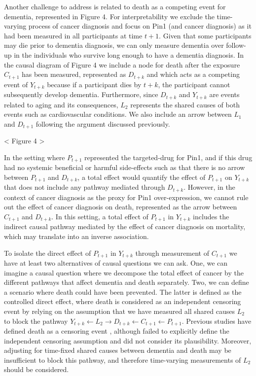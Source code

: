 \documentclass[
]{book}
\begin{document}
Another challenge to address is related to death as a competing event for dementia, represented in Figure 4. For interpretability we exclude the time-varying process of cancer diagnosis and focus on Pin1 (and cancer diagnosis) as it had been measured in all participants at time \(t+1\). Given that some participants may die prior to dementia diagnosis, we can only measure dementia over follow-up in the individuals who survive long enough to have a dementia diagnosis. In the causal diagram of Figure 4 we include a node for death after the exposure \(C_{t+1}\) has been measured, represented as \(D_{t+k}\) and which acts as a competing event of \(Y_{t+k}\) because if a participant dies by \(t + k\), the participant cannot subsequently develop dementia. Furthermore, since \(D_{t+k}\) and \(Y_{t+k}\) are events related to aging and its consequences, \(L_2\) represents the shared causes of both events such as cardiovascular conditions. We also include an arrow between \(L_1\) and \(D_{t+1}\) following the argument discussed previously.

\textless{} Figure 4 \textgreater{}

In the setting where \(P_{t+1}\) represented the targeted-drug for Pin1, and if this drug had no systemic beneficial or harmful side-effects such as that there is no arrow between \(P_{t+1}\) and \(D_{t+k}\), a total effect would quantify the effect of \(P_{t+1}\) on \(Y_{t+k}\) that does not include any pathway mediated through \(D_{t+k}\)\autocite{young2020}. However, in the context of cancer diagnosis as the proxy for Pin1 over-expression, we cannot rule out the effect of cancer diagnosis on death, represented as the arrow between \(C_{t+1}\) and \(D_{t+k}\). In this setting, a total effect of \(P_{t+1}\) in \(Y_{t+k}\) includes the indirect causal pathway mediated by the effect of cancer diagnosis on mortality, which may translate into an inverse association\autocite{young2020}.

To isolate the direct effect of \(P_{t+1}\) in \(Y_{t+k}\) through measurement of \(C_{t+1}\) we have at least two alternatives of causal questions we can ask. One, we can imagine a causal question where we decompose the total effect of cancer by the different pathways that affect dementia and death separately\autocite{stensrud2020}. Two, we can define a scenario where death could have been prevented. The latter is defined as the controlled direct effect, where death is considered as an independent censoring event by relying on the assumption that we have measured all shared causes \(L_2\) to block the pathway \(Y_{t+k} \leftarrow L_2 \rightarrow D_{t+k} \leftarrow C_{t+1} \leftarrow P_{t+1}\). Previous studies have defined death as a censoring event \autocite{frain2017}, although failed to explicitly define the independent censoring assumption and did not consider its plausibility. Moreover, adjusting for time-fixed shared causes between dementia and death may be insufficient to block this pathway, and therefore time-varying measurements of \(L_2\) should be considered.
\end{document}
